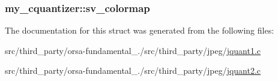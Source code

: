 \subsubsection[{sv\+\_\+colormap}]{ my\+\_\+cquantizer\+::sv\+\_\+colormap}\label{structmy__cquantizer_a9d0cd4d81691db3ec5f01e68fe6537bd}


The documentation for this struct was generated from the following files\+:\begin{DoxyCompactItemize}
\item 
src/third\+\_\+party/orsa-\/fundamental\+\_./src/third\+\_\+party/jpeg/\hyperlink{jquant1_8c}{jquant1.\+c}\item 
src/third\+\_\+party/orsa-\/fundamental\+\_./src/third\+\_\+party/jpeg/\hyperlink{jquant2_8c}{jquant2.\+c}\end{DoxyCompactItemize}
